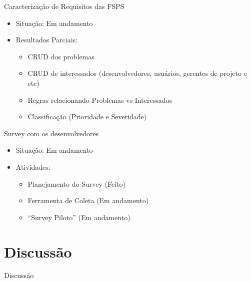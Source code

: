 \documentclass[t,14pt,mathserif]{beamer}
\begin{document}
\begin{frame}{Caracterização de Requisitos das FSPS}
		\begin{itemize}
			\item Situação: Em andamento
			\item Resultados Parciais:
				\begin{itemize}
					 \item CRUD dos problemas
                     \item CRUD de interessados (desenvolvedores, usuários,
                         gerentes de projeto e etc)
					 \item Regras relacionando Problemas vs Interessados
		             \item Classificação (Prioridade e Severidade)
				\end{itemize}
	    \end{itemize}
\end{frame}

\begin{frame}{Survey com os desenvolvedores}
		\begin{itemize}
			\item Situação: Em andamento
			\item Atividades:
			\begin{itemize}
				\item Planejamento do Survey (Feito)
				\item Ferramenta de Coleta (Em andamento)
				\item ``Survey Piloto'' (Em andamento)
			\end{itemize}
		\end{itemize}
\end{frame}

\section{Discussão}

\begin{frame}{Discussão}

\end{frame}
\end{document}

